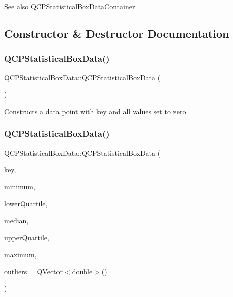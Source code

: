 \begin{DoxySeeAlso}{See also}
Q\+C\+P\+Statistical\+Box\+Data\+Container 
\end{DoxySeeAlso}


\subsection{Constructor \& Destructor Documentation}
\mbox{\label{class_q_c_p_statistical_box_data_ab96c4b93670a8dcac8a3d4080fd722ee}} 
\subsubsection{\texorpdfstring{Q\+C\+P\+Statistical\+Box\+Data()}{QCPStatisticalBoxData()}\hspace{0.1cm}{\footnotesize\ttfamily [1/2]}}
{\footnotesize\ttfamily Q\+C\+P\+Statistical\+Box\+Data\+::\+Q\+C\+P\+Statistical\+Box\+Data (\begin{DoxyParamCaption}{ }\end{DoxyParamCaption})}

Constructs a data point with key and all values set to zero. \mbox{\label{class_q_c_p_statistical_box_data_a66b0c6d39765d0feb49c286fba4e4ef5}} 
\subsubsection{\texorpdfstring{Q\+C\+P\+Statistical\+Box\+Data()}{QCPStatisticalBoxData()}\hspace{0.1cm}{\footnotesize\ttfamily [2/2]}}
{\footnotesize\ttfamily Q\+C\+P\+Statistical\+Box\+Data\+::\+Q\+C\+P\+Statistical\+Box\+Data (\begin{DoxyParamCaption}\item[{double}]{key,  }\item[{double}]{minimum,  }\item[{double}]{lower\+Quartile,  }\item[{double}]{median,  }\item[{double}]{upper\+Quartile,  }\item[{double}]{maximum,  }\item[{const \hyperlink{class_q_vector}{Q\+Vector}$<$ double $>$ \&}]{outliers = {\ttfamily \hyperlink{class_q_vector}{Q\+Vector}$<$double$>$()} }\end{DoxyParamCaption})}

